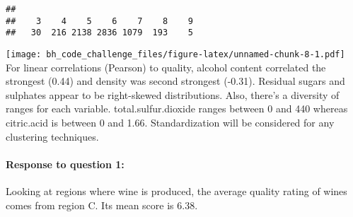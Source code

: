 \documentclass[
]{article}
\newenvironment{Shaded}{\begin{snugshade}}{\end{snugshade}}
\newcommand{\CommentTok}[1]{\textcolor[rgb]{0.56,0.35,0.01}{\textit{#1}}}
\newcommand{\DataTypeTok}[1]{\textcolor[rgb]{0.13,0.29,0.53}{#1}}
\newcommand{\KeywordTok}[1]{\textcolor[rgb]{0.13,0.29,0.53}{\textbf{#1}}}
\newcommand{\NormalTok}[1]{#1}
\newcommand{\OperatorTok}[1]{\textcolor[rgb]{0.81,0.36,0.00}{\textbf{#1}}}
\newcommand{\OtherTok}[1]{\textcolor[rgb]{0.56,0.35,0.01}{#1}}
\newcommand{\StringTok}[1]{\textcolor[rgb]{0.31,0.60,0.02}{#1}}
\begin{document}
\begin{Shaded}
\end{Shaded}

\begin{verbatim}
## 
##    3    4    5    6    7    8    9 
##   30  216 2138 2836 1079  193    5
\end{verbatim}

\begin{Shaded}
\end{Shaded}

\texttt{[image: bh\_code\_challenge\_files/figure-latex/unnamed-chunk-8-1.pdf]}
For linear correlations (Pearson) to quality, alcohol content correlated
the strongest (0.44) and density was second strongest (-0.31). Residual
sugars and sulphates appear to be right-skewed distributions. Also,
there's a diversity of ranges for each variable. total.sulfur.dioxide
ranges between 0 and 440 whereas citric.acid is between 0 and 1.66.
Standardization will be considered for any clustering techniques.

\hypertarget{response-to-question-1}{%
\paragraph{Response to question 1:}\label{response-to-question-1}}

Looking at regions where wine is produced, the average quality rating of
wines comes from region C. Its mean score is 6.38.
\end{document}
